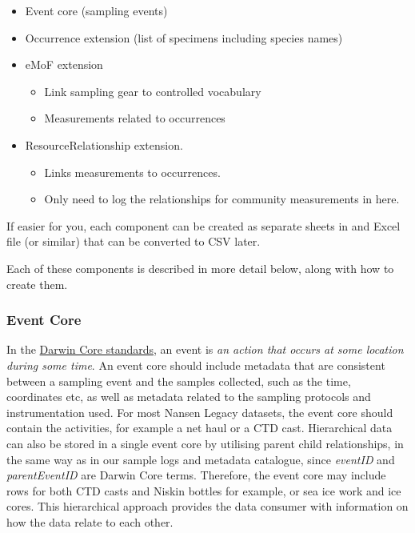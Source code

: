 \documentclass[a4paper,english, 11pt]{article}
\begin{document}
\begin{itemize}
\item Event core (sampling events)
\item Occurrence extension (list of specimens including species names)
\item eMoF extension
\begin{itemize}
\item Link sampling gear to controlled vocabulary
\item Measurements related to occurrences
\end{itemize}
\item ResourceRelationship extension.
\begin{itemize}
\item Links measurements to occurrences. 
\item Only need to log the relationships for community measurements in here. 
\end{itemize}
\end{itemize}  

If easier for you, each component can be created as separate sheets in and Excel file (or similar) that can be converted to CSV later.

Each of these components is described in more detail below, along with how to create them.

\subsubsection{Event Core}
\label{ss:eventcore}

In the \href{https://dwc.tdwg.org/list/#dwc_Event}{Darwin Core standards}, an event is \textit{an action that occurs at some location during some time}. An event core should include metadata that are consistent between a sampling event and the samples collected, such as the time, coordinates etc, as well as metadata related to the sampling protocols and instrumentation used. For most Nansen Legacy datasets, the event core should contain the activities, for example a net haul or a CTD cast. Hierarchical data can also be stored in a single event core by utilising parent child relationships, in the same way as in our sample logs and metadata catalogue, since \textit{eventID} and \textit{parentEventID} are Darwin Core terms. Therefore, the event core may include rows for both CTD casts and Niskin bottles for example, or sea ice work and ice cores. This hierarchical approach provides the data consumer with information on how the data relate to each other.
\end{document}
